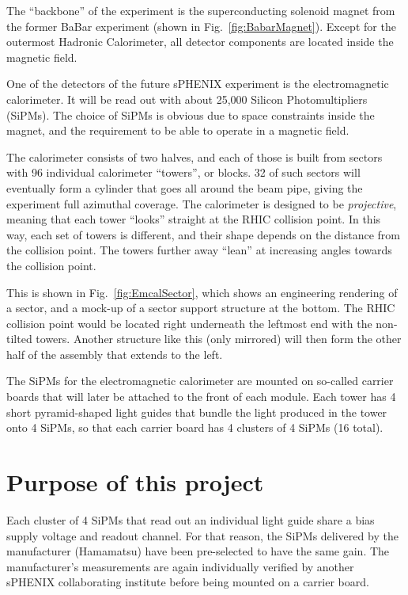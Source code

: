 \documentclass{article}
\begin{document}
The ``backbone'' of the experiment is the superconducting solenoid
magnet from the former BaBar experiment (shown in
Fig.~\ref{fig:BabarMagnet}). Except for the outermost Hadronic
Calorimeter, all detector components are located inside the magnetic
field.


One of the detectors of the future sPHENIX experiment is the
electromagnetic calorimeter. It will be read out with about 25,000
Silicon Photomultipliers (SiPMs). The choice of SiPMs is obvious due
to space constraints inside the magnet, and the requirement to be able
to operate in a magnetic field.

The calorimeter consists of two halves, and each of those is built
from sectors with 96 individual calorimeter ``towers'', or blocks. 32
of such sectors will eventually form a cylinder that goes all around the beam pipe, giving the experiment full azimuthal coverage. The
calorimeter is designed to be \emph{projective}, meaning that each
tower ``looks'' straight at the RHIC collision point. In this way,
each set of towers is different, and their shape depends on the
distance from the collision point. The towers further away ``lean'' at
increasing angles towards the collision point.


This is shown in Fig.~\ref{fig:EmcalSector}, which shows an
engineering rendering of a sector, and a mock-up of a sector support
structure at the bottom. The RHIC collision point would be located
right underneath the leftmost end with the non-tilted towers. Another
structure like this (only mirrored) will then form the other half of
the assembly that extends to the left. 

The SiPMs for the electromagnetic calorimeter are mounted on so-called
carrier boards that will later be attached to the front of each
module. Each tower has 4 short pyramid-shaped light guides that bundle
the light produced in the tower onto 4 SiPMs, so that each carrier board has 4 clusters of 4 SiPMs (16 total).

\section{Purpose of this project}
Each cluster of 4 SiPMs that read out an individual light guide share a bias supply voltage and readout channel. For that reason, the SiPMs delivered by the manufacturer (Hamamatsu) have been pre-selected to have the same gain. The manufacturer's measurements are again individually verified by another sPHENIX collaborating institute before being mounted on a carrier board.
\end{document}
